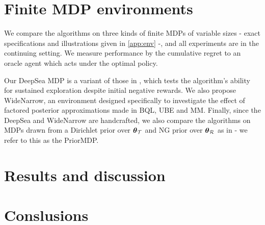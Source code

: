\documentclass{article}
\begin{document}
\section{Finite MDP environments}

We compare the algorithms on three kinds of finite MDPs of variable sizes - exact specifications and illustrations given in \cref{app:env} -, and all experiments are in the continuing setting. We measure performance by the cumulative regret to an oracle agent which acts under the optimal policy.

Our DeepSea MDP is a variant of those in \cite{rand_val_func, deepsea}, which tests the algorithm's ability for sustained exploration despite initial negative rewards. We also propose WideNarrow, an environment designed specifically to investigate the effect of factored posterior approximations made in BQL, UBE and MM. Finally, since the DeepSea and WideNarrow are handcrafted, we also compare the algorithms on MDPs drawn from a Dirichlet prior over $\boldsymbol{\theta}_{\mathcal{T}}$ and NG prior over $\boldsymbol{\theta}_{\mathcal{R}}$ as in \cite{psrl} - we refer to this as the PriorMDP.

\section{Results and discussion}

\section{Conslusions}

\clearpage



\end{document}
